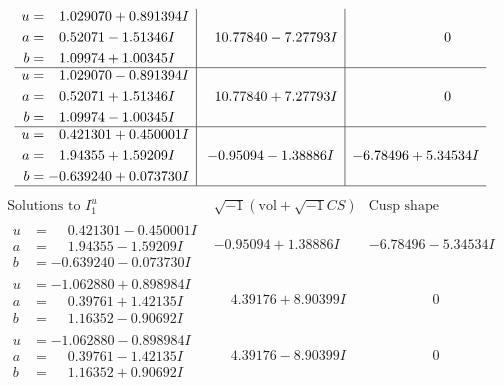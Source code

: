 \documentclass[1p]{elsarticle_modified}
\theoremstyle{definition}
\newcommand{\I}{\sqrt{-1}}
\begin{document}
$$\begin{array}{c|c|c}
\begin{aligned}
u &= \phantom{-}1.029070 + 0.891394 I \\
a &= \phantom{-}0.52071 - 1.51346 I \\
b &= \phantom{-}1.09974 + 1.00345 I\end{aligned}
 & \phantom{-}10.77840 - 7.27793 I & \phantom{-0.000000 } 0 \\ \hline\begin{aligned}
u &= \phantom{-}1.029070 - 0.891394 I \\
a &= \phantom{-}0.52071 + 1.51346 I \\
b &= \phantom{-}1.09974 - 1.00345 I\end{aligned}
 & \phantom{-}10.77840 + 7.27793 I & \phantom{-0.000000 } 0 \\ \hline\begin{aligned}
u &= \phantom{-}0.421301 + 0.450001 I \\
a &= \phantom{-}1.94355 + 1.59209 I \\
b &= -0.639240 + 0.073730 I\end{aligned}
 & -0.95094 - 1.38886 I & -6.78496 + 5.34534 I\\
 \hline 
 \end{array}$$\newpage$$\begin{array}{c|c|c}  
\text{Solutions to }I^u_{1}& \I (\text{vol} + \sqrt{-1}CS) & \text{Cusp shape}\\
 \hline 
\begin{aligned}
u &= \phantom{-}0.421301 - 0.450001 I \\
a &= \phantom{-}1.94355 - 1.59209 I \\
b &= -0.639240 - 0.073730 I\end{aligned}
 & -0.95094 + 1.38886 I & -6.78496 - 5.34534 I \\ \hline\begin{aligned}
u &= -1.062880 + 0.898984 I \\
a &= \phantom{-}0.39761 + 1.42135 I \\
b &= \phantom{-}1.16352 - 0.90692 I\end{aligned}
 & \phantom{-}4.39176 + 8.90399 I & \phantom{-0.000000 } 0 \\ \hline\begin{aligned}
u &= -1.062880 - 0.898984 I \\
a &= \phantom{-}0.39761 - 1.42135 I \\
b &= \phantom{-}1.16352 + 0.90692 I\end{aligned}
 & \phantom{-}4.39176 - 8.90399 I & \phantom{-0.000000 } 0 \\ \hline\begin{aligned}

\end{aligned}
\end{array}$$
\end{document}
